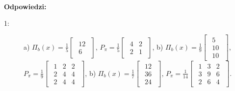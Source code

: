 \documentclass{article}
\begin{document}
\newpage
\textbf{Odpowiedzi:}
\begin{description}
    \item [1:]
        a) $\Pi_{b}(x) = \frac{1}{5}\begin{bmatrix}\begin{array}{r} 12\\6 \end{array}\end{bmatrix}$, $P_{\pi} = \frac{1}{5}\begin{bmatrix}\begin{array}{rr} 4 & 2\\  2 & 1 \end{array}\end{bmatrix}$,
        b) $\Pi_{b}(x) = \frac{1}{9}\begin{bmatrix}\begin{array}{r} 5\\10\\10 \end{array}\end{bmatrix}$, $P_{\pi} = \frac{1}{9}\begin{bmatrix}\begin{array}{rrr} 1 & 2 & 2\\  2 & 4 & 4\\ 2 & 4 & 4 \end{array}\end{bmatrix}$,
        b) $\Pi_{b}(x) = \frac{1}{7}\begin{bmatrix}\begin{array}{r} 12\\ 36\\ 24 \end{array}\end{bmatrix}$, $P_{\pi} = \frac{1}{14}\begin{bmatrix}\begin{array}{rrr} 1 & 3 & 2\\  3 & 9 & 6\\ 2 & 6 & 4 \end{array}\end{bmatrix}$.


\end{description}
\end{document}
